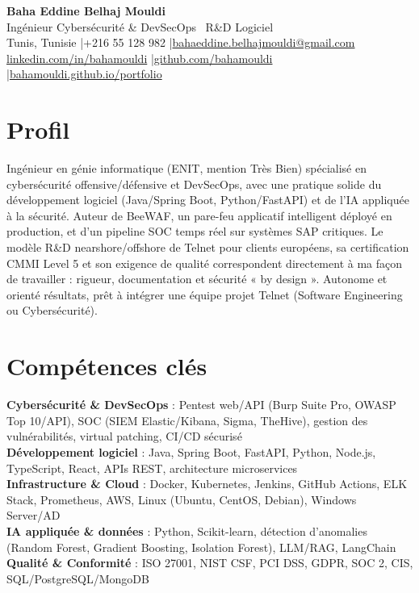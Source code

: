 \documentclass[a4paper,10pt]{article}
\begin{document}
\begin{center}
{\LARGE\bfseries\color{navy} Baha Eddine Belhaj Mouldi}\\[3pt]
{\normalsize\color{navy} Ingénieur Cybersécurité \& DevSecOps \textbar\ R\&D Logiciel}\\[4pt]
{\small Tunis, Tunisie \quad|\quad +216 55 128 982 \quad|\quad \href{mailto:bahaeddine.belhajmouldi@gmail.com}{bahaeddine.belhajmouldi@gmail.com}}\\[2pt]
{\small \href{https://www.linkedin.com/in/bahamouldi}{linkedin.com/in/bahamouldi} \quad|\quad \href{https://github.com/bahamouldi}{github.com/bahamouldi} \quad|\quad \href{https://bahamouldi.github.io/portfolio/}{bahamouldi.github.io/portfolio}}
\end{center}
\vspace{2pt}

\section{Profil}
Ingénieur en génie informatique (ENIT, mention Très Bien) spécialisé en cybersécurité offensive/défensive et DevSecOps, avec une pratique solide du développement logiciel (Java/Spring Boot, Python/FastAPI) et de l'IA appliquée à la sécurité. Auteur de BeeWAF, un pare-feu applicatif intelligent déployé en production, et d'un pipeline SOC temps réel sur systèmes SAP critiques. Le modèle R\&D nearshore/offshore de Telnet pour clients européens, sa certification CMMI Level 5 et son exigence de qualité correspondent directement à ma façon de travailler : rigueur, documentation et sécurité « by design ». Autonome et orienté résultats, prêt à intégrer une équipe projet Telnet (Software Engineering ou Cybersécurité).

\section{Compétences clés}
\textbf{Cybersécurité \& DevSecOps} : Pentest web/API (Burp Suite Pro, OWASP Top 10/API), SOC (SIEM Elastic/Kibana, Sigma, TheHive), gestion des vulnérabilités, virtual patching, CI/CD sécurisé\\[1pt]
\textbf{Développement logiciel} : Java, Spring Boot, FastAPI, Python, Node.js, TypeScript, React, APIs REST, architecture microservices\\[1pt]
\textbf{Infrastructure \& Cloud} : Docker, Kubernetes, Jenkins, GitHub Actions, ELK Stack, Prometheus, AWS, Linux (Ubuntu, CentOS, Debian), Windows Server/AD\\[1pt]
\textbf{IA appliquée \& données} : Python, Scikit-learn, détection d'anomalies (Random Forest, Gradient Boosting, Isolation Forest), LLM/RAG, LangChain\\[1pt]
\textbf{Qualité \& Conformité} : ISO 27001, NIST CSF, PCI DSS, GDPR, SOC 2, CIS, SQL/PostgreSQL/MongoDB
\end{document}
